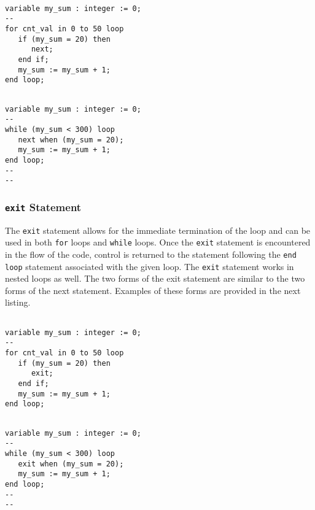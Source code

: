\vspace{10pt}
\noindent
\begin{minipage}{0.5\linewidth}
\begin{lstlisting}

variable my_sum : integer := 0; 
--
for cnt_val in 0 to 50 loop
   if (my_sum = 20) then 
      next; 
   end if; 
   my_sum := my_sum + 1; 
end loop;
\end{lstlisting}
\end{minipage}
\noindent
\begin{minipage}{0.5\linewidth}
\begin{lstlisting}

variable my_sum : integer := 0; 
--
while (my_sum < 300) loop
   next when (my_sum = 20); 
   my_sum := my_sum + 1; 
end loop; 
--
--
\end{lstlisting}
\end{minipage}

\subsubsection{\texttt{exit} Statement}
The \texttt{exit} statement allows for the immediate termination of the loop and can be used in both \texttt{for} loops and \texttt{while} loops. Once the \texttt{exit} statement is encountered in the flow of the code, control is returned to the statement following the \texttt{end loop} statement associated with the given loop. The \texttt{exit} statement works in nested loops as well. The two forms of the exit statement are similar to the two forms of the next statement. Examples of these forms are provided in the next listing.

\vspace{10pt}
\noindent
\begin{minipage}{0.5\linewidth}
\begin{lstlisting}

variable my_sum : integer := 0; 
--
for cnt_val in 0 to 50 loop
   if (my_sum = 20) then 
      exit; 
   end if; 
   my_sum := my_sum + 1; 
end loop; 
\end{lstlisting}
\end{minipage}
\noindent
\begin{minipage}{0.5\linewidth}
\begin{lstlisting}

variable my_sum : integer := 0; 
--
while (my_sum < 300) loop
   exit when (my_sum = 20); 
   my_sum := my_sum + 1; 
end loop; 
--
--
\end{lstlisting}
\end{minipage} 


